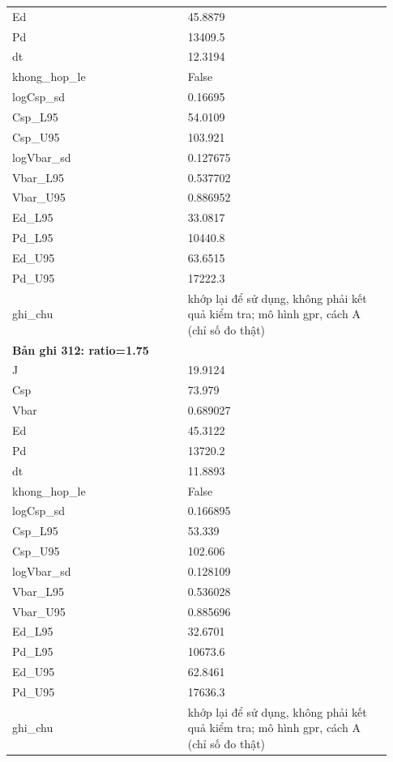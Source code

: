 \begin{longtable}{p{0.43\linewidth}p{0.50\linewidth}}
Ed & 45.8879 \\
Pd & 13409.5 \\
dt & 12.3194 \\
khong\_\allowbreak hop\_\allowbreak le & False \\
logCsp\_\allowbreak sd & 0.16695 \\
Csp\_\allowbreak L95 & 54.0109 \\
Csp\_\allowbreak U95 & 103.921 \\
logVbar\_\allowbreak sd & 0.127675 \\
Vbar\_\allowbreak L95 & 0.537702 \\
Vbar\_\allowbreak U95 & 0.886952 \\
Ed\_\allowbreak L95 & 33.0817 \\
Pd\_\allowbreak L95 & 10440.8 \\
Ed\_\allowbreak U95 & 63.6515 \\
Pd\_\allowbreak U95 & 17222.3 \\
ghi\_\allowbreak chu & khớp lại để sử dụng, không phải kết quả kiểm tra; mô hình gpr, cách A (chỉ số đo thật) \\
\midrule
\multicolumn{2}{p{0.95\linewidth}}{\textbf{Bản ghi 312: ratio=1.75}} \\
J & 19.9124 \\
Csp & 73.979 \\
Vbar & 0.689027 \\
Ed & 45.3122 \\
Pd & 13720.2 \\
dt & 11.8893 \\
khong\_\allowbreak hop\_\allowbreak le & False \\
logCsp\_\allowbreak sd & 0.166895 \\
Csp\_\allowbreak L95 & 53.339 \\
Csp\_\allowbreak U95 & 102.606 \\
logVbar\_\allowbreak sd & 0.128109 \\
Vbar\_\allowbreak L95 & 0.536028 \\
Vbar\_\allowbreak U95 & 0.885696 \\
Ed\_\allowbreak L95 & 32.6701 \\
Pd\_\allowbreak L95 & 10673.6 \\
Ed\_\allowbreak U95 & 62.8461 \\
Pd\_\allowbreak U95 & 17636.3 \\
ghi\_\allowbreak chu & khớp lại để sử dụng, không phải kết quả kiểm tra; mô hình gpr, cách A (chỉ số đo thật) \\

\end{longtable}
